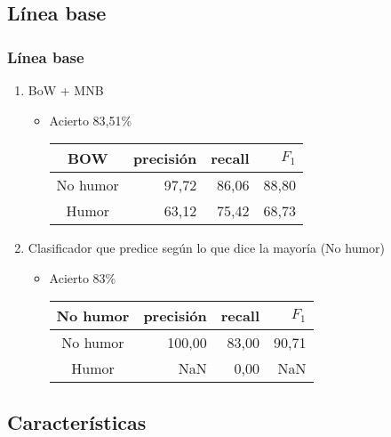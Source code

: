 \subsection{Línea base}
\begin{frame}
    \frametitle{Línea base}

    \begin{enumerate}[<+->]
        \item BoW + MNB

        \begin{itemize}
            \item Acierto 83,51\%

            \begin{center}
                \begin{tabular}{ c | r | r | r }
                    \textbf{BOW} & precisión & recall & $F_1$ \\
                    \hline
                    No humor & 97,72 & 86,06 & 88,80 \\
                    \hline
                    Humor & 63,12 & 75,42 & 68,73 \\
                \end{tabular}
            \end{center}
        \end{itemize}

        \item Clasificador que predice según lo que dice la mayoría (No humor)

        \begin{itemize}
            \item Acierto 83\%

            \begin{center}
                \begin{tabular}{ c | r | r | r }
                    \textbf{No humor} & precisión & recall & $F_1$ \\
                    \hline
                    No humor & 100,00 & 83,00 & 90,71 \\
                    \hline
                    Humor & NaN & 0,00 & NaN \\
                \end{tabular}
            \end{center}
        \end{itemize}
    \end{enumerate}
\end{frame}

\subsection{Características}

